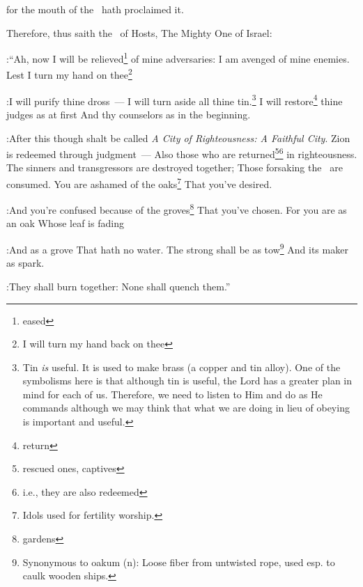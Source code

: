 \begin{inparaenum}
  \pc for the mouth of the \lord\ hath proclaimed it.%
  
   Therefore, thus saith the \lord\ of Hosts, The Mighty One of Israel:\smallskip%

:``Ah, now I will be relieved\footnote{eased} of mine adversaries: I am avenged of mine enemies.%
   Lest I turn my hand on thee\footnote{I will turn my hand back on thee}%

:I will purify thine dross~--- I will turn aside all thine tin.\footnote{Tin \emph{is} useful. It is used to make brass (a copper and tin alloy). One of the symbolisms here is that although tin is useful, the Lord has a greater plan in mind for each of us. Therefore, we need to listen to Him and do as He commands although we may think that what we are doing in lieu of obeying is important and useful.}%
   I will restore\footnote{return} thine judges as at first And thy counselors as in the beginning.%

:After this though shalt be called \textit{A City of Righteousness: A Faithful City}.%
   Zion is redeemed through judgment~--- Also those who are returned\footnote{rescued ones, captives}\footnote{i.e., they are also redeemed} in righteousness.%
   The sinners and transgressors are destroyed together; Those forsaking the \lord\ are consumed.%
   You are ashamed of the oaks\footnote{Idols used for fertility worship.} That you've desired.%

:And you're confused because of the groves\footnote{gardens} That you've chosen.%
   For you are as an oak Whose leaf is fading%

:And as a grove That hath no water.%
   The strong shall be as tow\footnote{Synonymous to oakum (n): Loose fiber from untwisted rope, used esp. to caulk wooden ships.} And its maker as spark.%

:They shall burn together: None shall quench them.''%
\end{inparaenum}
